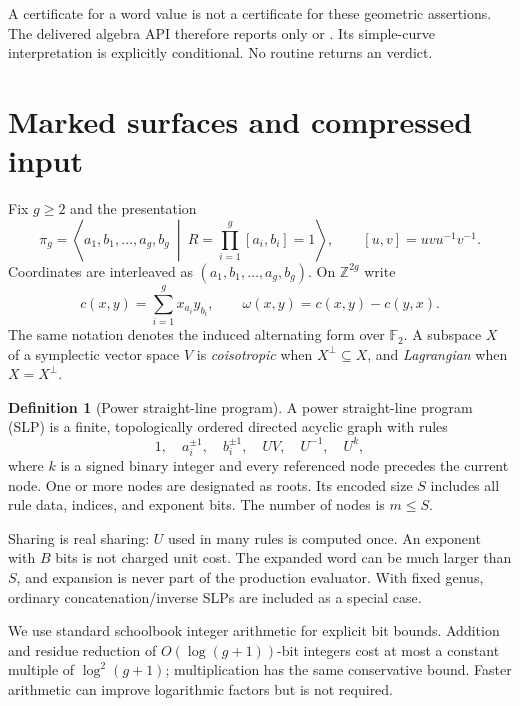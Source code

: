 \documentclass[11pt,letterpaper]{article}
\theoremstyle{definition}
\newtheorem{definition}[definition]{Definition}
\theoremstyle{remark}
\newcommand{\F}{\mathbb F_2}
\newcommand{\Z}{\mathbb Z}
\newcommand{\code}[1]{\texttt{\detokenize{#1}}}
\begin{document}
A certificate for a word value is not a certificate for these geometric assertions. The delivered algebra API therefore reports only \code{NONTRIVIAL} or \code{UNDETECTED}. Its simple-curve interpretation is explicitly conditional. No routine returns an \code{UNKNOT} verdict.

\section{Marked surfaces and compressed input}
\label{sec:input}
Fix $g\ge2$ and the presentation
\begin{equation}\label{eq:presentation}
 \pi_g=\left\langle a_1,b_1,\ldots,a_g,b_g\ \middle|\
 R=\prod_{i=1}^g[a_i,b_i]=1\right\rangle,
 \qquad [u,v]=uvu^{-1}v^{-1}.
\end{equation}
Coordinates are interleaved as $(a_1,b_1,\ldots,a_g,b_g)$. On $\Z^{2g}$ write
\begin{equation}\label{eq:cocycle}
 c(x,y)=\sum_{i=1}^g x_{a_i}y_{b_i},\qquad
 \omega(x,y)=c(x,y)-c(y,x).
\end{equation}
The same notation denotes the induced alternating form over $\F$. A subspace $X$ of a symplectic vector space $V$ is \emph{coisotropic} when $X^\perp\subseteq X$, and \emph{Lagrangian} when $X=X^\perp$.

\begin{definition}[Power straight-line program]
A power straight-line program (SLP) is a finite, topologically ordered directed acyclic graph with rules
\[
 1,\quad a_i^{\pm1},\quad b_i^{\pm1},\quad UV,\quad U^{-1},\quad U^k,
\]
where $k$ is a signed binary integer and every referenced node precedes the current node. One or more nodes are designated as roots. Its encoded size $S$ includes all rule data, indices, and exponent bits. The number of nodes is $m\le S$.
\end{definition}
Sharing is real sharing: $U$ used in many rules is computed once. An exponent with $B$ bits is not charged unit cost. The expanded word can be much larger than $S$, and expansion is never part of the production evaluator. With fixed genus, ordinary concatenation/inverse SLPs are included as a special case.

We use standard schoolbook integer arithmetic for explicit bit bounds. Addition and residue reduction of $O(\log(g+1))$-bit integers cost at most a constant multiple of $\log^2(g+1)$; multiplication has the same conservative bound. Faster arithmetic can improve logarithmic factors but is not required.
\end{document}
